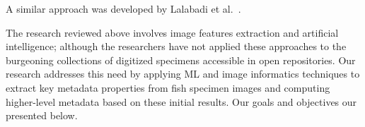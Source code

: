 \documentclass[conference]{IEEEtran}
\begin{document}
A similar approach was developed by Lalabadi et al.~\cite{Lalabadi2020FishFC}.


The research reviewed above involves image features extraction and
artificial intelligence; although the researchers have not applied these
approaches to the burgeoning collections of digitized specimens
accessible in open repositories. Our research addresses this need by
applying ML and image informatics techniques to extract key
metadata properties from fish specimen images and computing
higher-level metadata based on these initial results.
Our goals and objectives our presented below.

\end{document}

